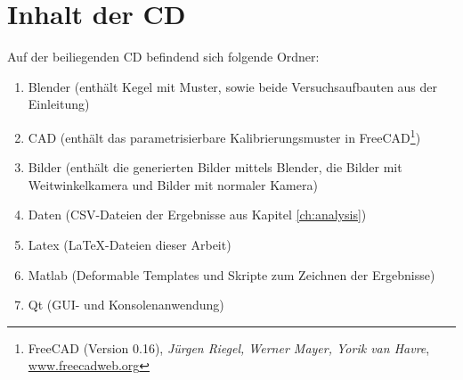\chapter{Inhalt der CD}
\label{ch:cdContent}

Auf der beiliegenden CD befindend sich folgende Ordner:
\begin{enumerate}
	\item Blender (enthält Kegel mit Muster, sowie beide Versuchsaufbauten aus der Einleitung)
	\item CAD (enthält das parametrisierbare Kalibrierungsmuster in FreeCAD\footnote{FreeCAD (Version 0.16), \textit{Jürgen Riegel, Werner Mayer, Yorik van Havre}, \url{www.freecadweb.org}})
	\item Bilder (enthält die generierten Bilder mittels Blender, die Bilder mit Weitwinkelkamera und Bilder mit normaler Kamera)
	\item Daten (CSV-Dateien der Ergebnisse aus Kapitel \ref{ch:analysis})
	\item Latex (\LaTeX-Dateien dieser Arbeit)
	\item Matlab (Deformable Templates und Skripte zum Zeichnen der Ergebnisse)
	\item Qt (GUI- und Konsolenanwendung)

\end{enumerate}
